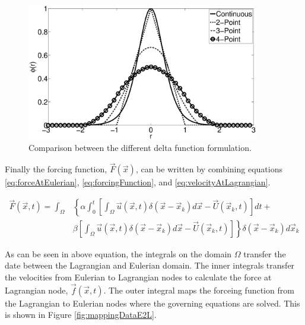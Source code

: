 \documentclass{aiaa-pretty}
\begin{document}
%
\begin{figure}
	\centering
	\includegraphics[height=6.0cm]{figure/heaviside_comparison.eps}
	\caption{Comparison between the different delta function formulation.}
	\label{fig:heavisideComparison}
\end{figure}
%

Finally the forcing function, $\vec{F}(\vec{x})$, can be written by combining equations \eqref{eq:forceAtEulerian}, \eqref{eq:forcingFunction}, and \eqref{eq:velocityAtLagrangian}.

%
\begin{equation}
\begin{aligned}\label{eq:forceAtEulerianFinal}
	\vec{F}(\vec{x}, t) = 
	\int_\Omega 
	&\left\{
 	\alpha \int_0^t
	\left[
	\int_\Omega \vec{u} (\vec{x}, t) \delta(\vec{x} - \vec{x}_k) d\vec{x} - \vec{U}\left( \vec{x}_k, t \right)
	\right]dt + \right. \\
	&\left.
	\beta \left[
	\int_\Omega \vec{u} (\vec{x}, t) \delta(\vec{x} - \vec{x}_k) d\vec{x} - \vec{U}\left( \vec{x}_k, t \right)
	\right]
	\right\} \delta(\vec{x} - \vec{x}_k) d\vec{x}_k
\end{aligned}
\end{equation}
%

As can be seen in above equation, the integrals on the domain $\Omega$ transfer the date between the Lagrangian and Eulerian domain. The inner integrals transfer the velocities from Eulerian to Lagrangian nodes to calculate the force at Lagrangian node, $\vec{f}\left( \vec{x}, t \right)$. The outer integral maps the forceing function from the Lagrangian to Eulerian nodes where the governing equations are solved. This is shown in Figure \ref{fig:mappingDataE2L}.
\end{document}
